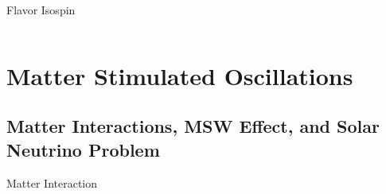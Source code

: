 \documentclass[9pt]{beamer}
\begin{document}
\begin{darkframes}
\begin{frame}{Flavor Isospin}
\begin{columns}[T]
\begin{column}{0.5\textwidth}
\end{column}
\end{columns}




\end{frame}





\section{Matter Stimulated Oscillations}


\subsection{Matter Interactions, MSW Effect, and Solar Neutrino Problem}


\begin{frame}{Matter Interaction}




\end{frame}
\end{darkframes}
\end{document}
